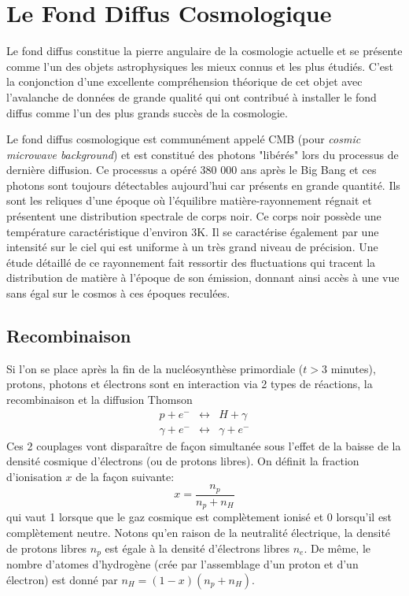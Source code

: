 
\chapter{Le Fond Diffus Cosmologique}

Le fond diffus constitue la pierre angulaire de la cosmologie actuelle et se présente comme l'un des objets astrophysiques les mieux connus et les plus étudiés. C'est la conjonction d'une excellente compréhension théorique de cet objet avec l'avalanche de données de grande qualité qui ont contribué à installer le fond diffus comme l'un des plus grands succès de la cosmologie.

Le fond diffus cosmologique est communément appelé CMB (pour \textit{cosmic microwave background}) et est constitué des photons "libérés" lors du processus de dernière diffusion. Ce processus a opéré 380 000 ans après le Big Bang et ces photons sont toujours détectables aujourd'hui car présents en grande quantité. Ils sont les reliques d'une époque où l'équilibre matière-rayonnement régnait et présentent une distribution spectrale de corps noir. Ce corps noir possède une température caractéristique d'environ 3K. Il se caractérise également par une intensité sur le ciel qui est uniforme à un très grand niveau de précision. Une étude détaillé de ce rayonnement fait ressortir des fluctuations qui tracent la distribution de matière à l'époque de son émission, donnant ainsi accès à une vue sans égal sur le cosmos à ces époques reculées.

\section{Recombinaison}
Si l'on se place après la fin de la nucléosynthèse primordiale ($t>3$ minutes), protons, photons et électrons sont en interaction via 2 types de réactions, la recombinaison et la diffusion Thomson
\begin{eqnarray}
p + e^- &\leftrightarrow& H+ \gamma\label{e:rec}\\
\gamma +e^- &\leftrightarrow& \gamma +e^- 
\end{eqnarray}
Ces 2 couplages vont disparaître de façon simultanée sous l'effet de la baisse de la densité cosmique d'électrons (ou de protons libres). On définit la fraction d'ionisation $x$ de la façon suivante:
\begin{equation}
x=\frac{n_p}{n_p+n_H}
\end{equation} 
qui vaut 1 lorsque que le gaz cosmique est complètement ionisé et 0 lorsqu'il est complètement neutre. Notons qu'en raison de la neutralité électrique, la densité de protons libres $n_p$ est égale à la densité d'électrons libres $n_e$. De même, le nombre d'atomes d'hydrogène (crée par l'assemblage d'un proton et d'un électron) est donné par $n_H=(1-x) (n_p+n_H)$. 

